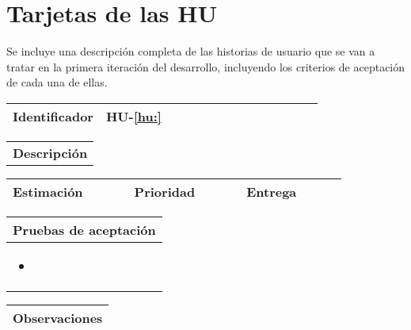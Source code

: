 \documentclass[11pt]{article}
\begin{document}
\section{Tarjetas de las HU}
Se incluye una descripción completa de las historias de usuario que se van a tratar en la primera iteración del desarrollo, incluyendo los criterios de aceptación de cada una de ellas.
\begin{table}[H]
  \centering
  \begin{tabular}{p{0.3\linewidth}|p{0.7\linewidth}}
    \toprule
    \textbf{Identificador} & \textbf{HU-\ref{hu:}}\\
    \bottomrule
  \end{tabular}

  \begin{tabular}{p{1.028\linewidth}}
    \textbf{Descripción}
    \midrule
  \end{tabular}

  \begin{tabular}{p{0.18\linewidth}|p{0.1\linewidth}|p{0.18\linewidth}|p{0.1\linewidth}|p{0.18\linewidth}|p{0.1\linewidth}}
    \toprule
    \textbf{Estimación} & & \textbf{Prioridad} & & \textbf{Entrega} & \\
    \bottomrule
  \end{tabular}

  \begin{tabular}{p{1.028\linewidth}}
    \textbf{Pruebas de aceptación}\\
  \midrule
  \begin{itemize}
  \item 
  \end{itemize}
\end{tabular}
\begin{tabular}{p{1.028\linewidth}}
  \textbf{Observaciones}\\
  \midrule
\end{tabular}
\end{table}
\end{document}
